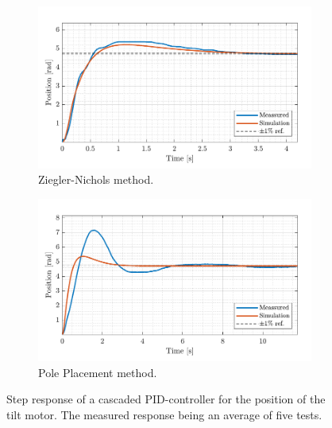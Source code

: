 \documentclass[../../main.tex]{subfiles}
\begin{document}
\begin{figure}[H]
     \centering
     \begin{subfigure}[b]{0.49\textwidth}
         \centering
         \includegraphics[width=\textwidth]{Sections/Test/Images/CascadeTiltTestZN.pdf}
         \caption{Ziegler-Nichols method.}
         \label{fig:Cascade_ZN_tilt}
     \end{subfigure}
     \hfill
     \begin{subfigure}[b]{0.49\textwidth}
         \centering
         \includegraphics[width=\textwidth]{Sections/Test/Images/CascadeTiltTestPP.pdf}
         \caption{Pole Placement method.}
         \label{fig:cascade_model_tilt}
     \end{subfigure}
        \caption{Step response of a cascaded PID-controller for the position of the tilt motor. The measured response being an average of five tests.}
        \label{fig:CascadeTilt}
\end{figure}
\end{document}
